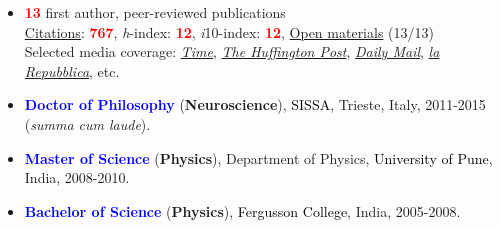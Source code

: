\documentclass[10pt]{article}
\begin{document}

	
	\begin{itemize}
	\item \textbf{\textcolor{red}{13}} first author, peer-reviewed publications\\
	
	\href{https://scholar.google.it/citations?user=kSYuYTUAAAAJ&hl=en&oi=ao}{Citations}: \textbf{\textcolor{red}{767}}, \textit{h}-index: \textbf{\textcolor{red}{12}}, \textit{i}10-index: \textbf{\textcolor{red}{12}}, \href{https://osf.io/hk5f3/}{Open materials} (13/13)\\
	
	Selected media coverage: \href{http://time.com/3242/driving-over-your-best-friend-its-the-right-thing-to-do/}{\textit{Time}}, \href{http://www.huffingtonpost.com/entry/autism-empathy-brain-research_us_56f92575e4b014d3fe237413}{\textit{The Huffington Post}}, \href{http://www.dailymail.co.uk/sciencetech/article-4308284/Virtual-reality-experiment-puts-altruism-test.html}{\textit{Daily Mail}}, \href{http://www.repubblica.it/scienze/2017/04/11/news/area_cervello_perdono-162669836/?rss}{\textit{la Repubblica}}, etc.
	
     \end{itemize}

	
	\begin{itemize}	
	
	\itemsep-0.1em
	\item \textbf{\textcolor{blue}{Doctor of Philosophy}} (\textbf{Neuroscience}), \textcolor{black}{SISSA}, Trieste, Italy, 2011-2015 (\textit{summa cum laude}).

	\item \textbf{\textcolor{blue}{Master of Science}} (\textbf{Physics}), Department of Physics, \textcolor{black}{University of Pune}, India, 2008-2010.%
	
	\item \textbf{\textcolor{blue}{Bachelor of Science}} (\textbf{Physics}), \textcolor{black}{Fergusson College}, India, 2005-2008.%

    \end{itemize}
\end{document}
